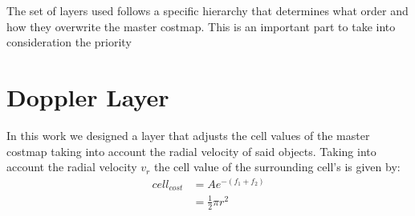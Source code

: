 The set of layers used follows a specific hierarchy that determines what order and how they overwrite the master costmap. This is an important part to take into consideration the priority


\section{Doppler Layer}
In this work we designed a layer that adjusts the cell values of the master costmap taking into account the radial velocity of said objects. Taking into account the radial velocity $v_r$ the cell value of the surrounding cell's is given by:
\begin{equation} \label{eq1}
\begin{split}
cell_{cost} & = A e^{-(f_1+f_2)} \\
 & = \frac{1}{2} \pi r^2
\end{split}
\end{equation}




